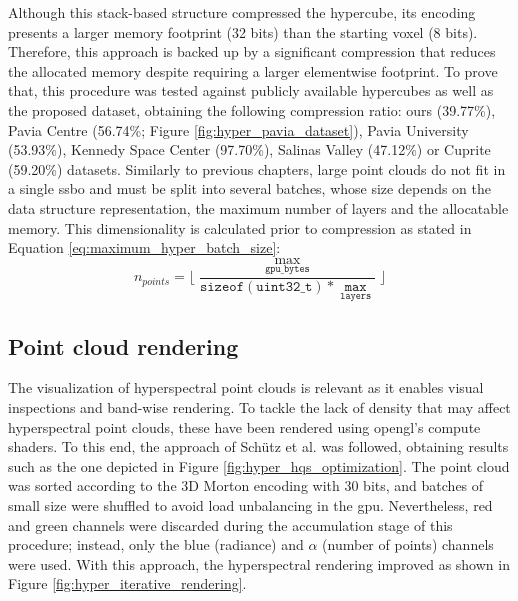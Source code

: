 Although this stack-based structure compressed the hypercube, its encoding presents a larger memory footprint (32 bits) than the starting voxel (8 bits). Therefore, this approach is backed up by a significant compression that reduces the allocated memory despite requiring a larger elementwise footprint. To prove that, this procedure was tested against publicly available hypercubes \cite{noauthor_hyperspectral_nodate} as well as the proposed dataset, obtaining the following compression ratio: ours (39.77\%), Pavia Centre (56.74\%; Figure \ref{fig:hyper_pavia_dataset}), Pavia University (53.93\%), Kennedy Space Center (97.70\%), Salinas Valley (47.12\%) or Cuprite (59.20\%) datasets. Similarly to previous chapters, large point clouds do not fit in a single \acrshort{ssbo} and must be split into several batches, whose size depends on the data structure representation, the maximum number of layers and the allocatable memory. This dimensionality is calculated prior to compression as stated in Equation \ref{eq:maximum_hyper_batch_size}:
\begin{equation}
    n_{\textit{points}} = \lfloor{\frac{\max_{\mathtt{gpu\_bytes}}}{\mathtt{sizeof(uint32\_t)} * \mathtt{\max_{\mathtt{layers}}}}\rfloor}
    \label{eq:maximum_hyper_batch_size}
\end{equation}

\subsection{Point cloud rendering}

The visualization of hyperspectral point clouds is relevant as it enables visual inspections and band-wise rendering. To tackle the lack of density that may affect hyperspectral point clouds, these have been rendered using \acrshort{opengl}'s compute shaders. To this end, the approach of Schütz et al. \cite{schutz_rendering_2021} was followed, obtaining results such as the one depicted in Figure \ref{fig:hyper_hqs_optimization}. The point cloud was sorted according to the 3D Morton encoding with 30 bits, and batches of small size were shuffled to avoid load unbalancing in the \acrshort{gpu}. Nevertheless, red and green channels were discarded during the accumulation stage of this procedure; instead, only the blue (radiance) and $\alpha$ (number of points) channels were used. With this approach, the hyperspectral rendering improved as shown in Figure \ref{fig:hyper_iterative_rendering}.

